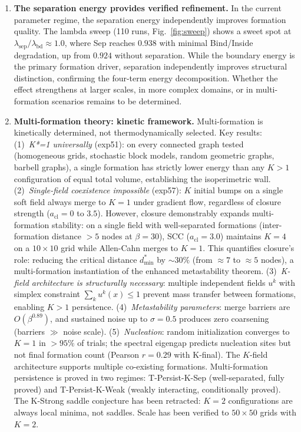\documentclass[lettersize,journal]{IEEEtran}
\begin{document}
\begin{enumerate}
\item \textbf{The separation energy provides verified refinement.} In the current parameter regime, the separation energy independently improves formation quality. The lambda sweep (110 runs, Fig.~\ref{fig:sweep}) shows a sweet spot at $\lambda_{\mathrm{sep}}/\lambda_{\mathrm{bd}} \approx 1.0$, where Sep reaches $0.938$ with minimal Bind/Inside degradation, up from $0.924$ without separation. While the boundary energy is the primary formation driver, separation independently improves structural distinction, confirming the four-term energy decomposition. Whether the effect strengthens at larger scales, in more complex domains, or in multi-formation scenarios remains to be determined.

\item \textbf{Multi-formation theory: kinetic framework.} Multi-formation is kinetically determined, not thermodynamically selected. Key results: (1)~\emph{K*=1 universally} (exp51): on every connected graph tested (homogeneous grids, stochastic block models, random geometric graphs, barbell graphs), a single formation has strictly lower energy than any $K > 1$ configuration of equal total volume, establishing the isoperimetric wall. (2)~\emph{Single-field coexistence impossible} (exp57): $K$ initial bumps on a single soft field always merge to $K=1$ under gradient flow, regardless of closure strength ($a_{\mathrm{cl}} = 0$ to $3.5$). However, closure demonstrably expands multi-formation stability: on a single field with well-separated formations (inter-formation distance $> 5$ nodes at $\beta=30$), SCC ($a_{\mathrm{cl}}=3.0$) maintains $K=4$ on a $10 \times 10$ grid while Allen-Cahn merges to $K=1$. This quantifies closure's role: reducing the critical distance $d_{\min}^*$ by $\sim 30\%$ (from $\approx 7$ to $\approx 5$ nodes), a multi-formation instantiation of the enhanced metastability theorem. (3)~\emph{K-field architecture is structurally necessary}: multiple independent fields $u^k$ with simplex constraint $\sum_k u^k(x) \leq 1$ prevent mass transfer between formations, enabling $K > 1$ persistence. (4)~\emph{Metastability parameters}: merge barriers are $O(\beta^{0.89})$, and sustained noise up to $\sigma = 0.5$ produces zero coarsening (barriers $\gg$ noise scale). (5)~\emph{Nucleation}: random initialization converges to $K=1$ in $>95\%$ of trials; the spectral eigengap predicts nucleation sites but not final formation count (Pearson $r = 0.29$ with K-final). The $K$-field architecture supports multiple co-existing formations. Multi-formation persistence is proved in two regimes: T-Persist-K-Sep (well-separated, fully proved) and T-Persist-K-Weak (weakly interacting, conditionally proved). The K-Strong saddle conjecture has been retracted: $K = 2$ configurations are always local minima, not saddles. Scale has been verified to $50 \times 50$ grids with $K = 2$.
\end{enumerate}
\end{document}
